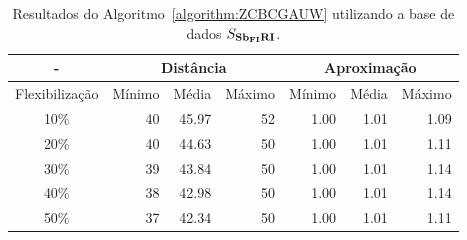 \begin{table}[!htb]
  \caption{Resultados do Algoritmo~\ref{algorithm:ZCBCGAUW} utilizando a base de dados $S_{\textbf{Sb\textsubscript{FI}RI}}{}$.}
  \label{table:CGVMJXDZ}
  \centering
  \begin{tabular}{|c|r|r|r|r|r|r|}
    \hline
      -            & \multicolumn{3}{c|}{Distância}             & \multicolumn{3}{c|}{Aproximação}           \\ \hline
    Flexibilização & Mínimo       & Média        & Máximo       & Mínimo       & Média        & Máximo       \\ \hline  
    10\%           & 40           & 45.97        & 52           & 1.00         & 1.01         & 1.09         \\ \hline
    20\%           & 40           & 44.63        & 50           & 1.00         & 1.01         & 1.11         \\ \hline
    30\%           & 39           & 43.84        & 50           & 1.00         & 1.01         & 1.14         \\ \hline
    40\%           & 38           & 42.98        & 50           & 1.00         & 1.01         & 1.14         \\ \hline
    50\%           & 37           & 42.34        & 50           & 1.00         & 1.01         & 1.11         \\ \hline    
  \end{tabular}
\end{table}
